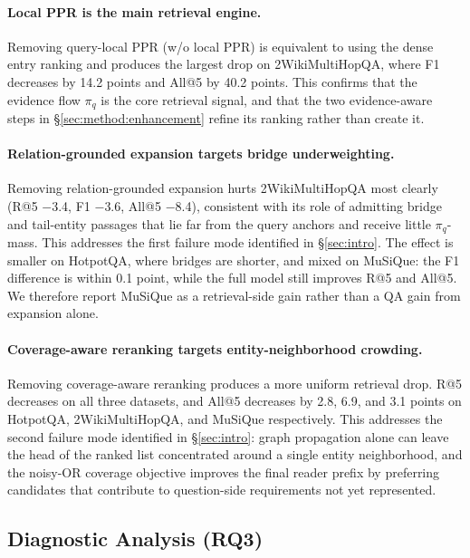 \paragraph{Local PPR is the main retrieval engine.}
Removing query-local PPR (w/o local PPR) is equivalent to using the
dense entry ranking and produces the largest drop on 2WikiMultiHopQA,
where F1 decreases by 14.2 points and All@5 by 40.2 points. This
confirms that the evidence flow $\pi_q$ is the core retrieval signal,
and that the two evidence-aware steps in
\S\ref{sec:method:enhancement} refine its ranking rather than create it.

\paragraph{Relation-grounded expansion targets bridge underweighting.}
Removing relation-grounded expansion hurts 2WikiMultiHopQA most clearly
(R@5 $-$3.4, F1 $-$3.6, All@5 $-$8.4), consistent with its role of
admitting bridge and tail-entity passages that lie far from the query
anchors and receive little $\pi_q$-mass. This addresses the first
failure mode identified in \S\ref{sec:intro}. The effect is smaller on
HotpotQA, where bridges are shorter, and mixed on MuSiQue: the F1
difference is within 0.1 point, while the full model still improves
R@5 and All@5. We therefore report MuSiQue as a retrieval-side gain
rather than a QA gain from expansion alone.

\paragraph{Coverage-aware reranking targets entity-neighborhood crowding.}
Removing coverage-aware reranking produces a more uniform retrieval
drop. R@5 decreases on all three datasets, and All@5 decreases by 2.8,
6.9, and 3.1 points on HotpotQA, 2WikiMultiHopQA, and MuSiQue
respectively. This addresses the second failure mode identified in
\S\ref{sec:intro}: graph propagation alone can leave the head of the
ranked list concentrated around a single entity neighborhood, and the
noisy-OR coverage objective improves the final reader prefix by
preferring candidates that contribute to question-side requirements
not yet represented.

\subsection{Diagnostic Analysis (RQ3)}
\label{sec:experiments:analysis}


